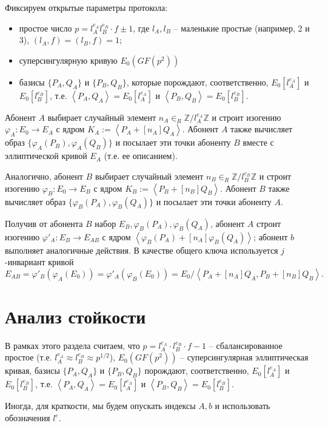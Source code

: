 \documentclass[a4paper,12pt]{article}
\newcommand{\ZZ}{\mathbb{Z}}
\newcommand{\tr}[1]{\left\langle #1\right\rangle}
\theoremstyle{definition}
\begin{document}
Фиксируем открытые параметры протокола:
\begin{itemize}
 \item простое число $  p=l_A^{e_A}l_B^{e_B}\cdot f  \pm 1$, где $l_A,l_B$ -- маленькие простые (например, 2 и 3),
$(l_A,f)=(l_B,f)=1$;
 \item суперсингулярную кривую $E_0(GF(p^2))$
 \item базисы $\{P_A,Q_A\}$ и $\{P_B,Q_B\}$, которые порождают, соответственно, $E_0[l_A^{e_A}]$ и $E_0[l_B^{e_B}]$, т.е. $\tr{P_A,Q_A}=E_0[l_A^{e_A}]$ и $\tr{P_B,Q_B}=E_0[l_B^{e_B}]$.

\end{itemize}

 Абонент $A$ выбирает  случайный элемент $ n_A\in_R\ZZ/l_A^{e_A}\ZZ$ %
 и строит изогению $\varphi_A:E_0\to E_A$ с ядром $K_A:=\tr{ P_A+[n_A]Q_A}$.  Абонент $A$  также вычисляет образ $\{\varphi_A(P_B),\varphi_A(Q_B)\}$ и посылает эти точки абоненту $B$ вместе с эллиптической кривой $E_A$ (т.е. ее описанием).
 
 Аналогично, абонент $B$ выбирает   случайный элемент  $ n_B\in_R\ZZ/l_B^{e_B}\ZZ$ %
 и строит изогению $\varphi_B:E_0\to E_B$ с ядром $K_B:=\tr{ P_B+[n_B]Q_B}$.  Абонент $B$  также вычисляет образ $\{\varphi_B(P_A),\varphi_B(Q_A)\}$ и посылает эти точки абоненту $A$.
 
 Получив от абонента $B$ набор $E_B, \varphi_B(P_A),\varphi_B(Q_A)$, абонент $A$ строит изогению $\varphi'_A:E_B\to E_{AB}$ с ядром $\tr{ \varphi_B(P_A)+[n_A]\varphi_B(Q_A)}$; абонент $b$ выполняет аналогичные действия.
 В качестве общего ключа  используется $j$-инвариант кривой
 $$
 E_{AB}=\varphi'_B(\varphi_A(E_0))=\varphi'_A(\varphi_B(E_0))=E_0/\tr{ P_A+[n_A]Q_A,  P_B+[n_B]Q_B }.
 $$

\section{Анализ стойкости}\label{analysis}

В рамках этого раздела считаем, что $p=l_A^{e_A}\cdot l_B^{e_B}\cdot f-1$ -- сбалансированное простое (т.е. $l_A^{e_A}\approx l_B^{e_B}\approx p^{1/2}$), $E_0(GF(p^2))$ -- суперсингулярная эллиптическая кривая, базисы $\{P_A,Q_A\}$ и $\{P_B,Q_B\}$
порождают, соответственно, $E_0[l_A^{e_A}]$ и $E_0[l_B^{e_B}]$, т.е. $\tr{P_A,Q_A}=E_0[l_A^{e_A}]$ и $\tr{P_B,Q_B}=E_0[l_B^{e_B}]$. 

Иногда, для краткости, мы будем опускать индексы $A, b$ и использовать обозначения $l^e$.
\end{document}
